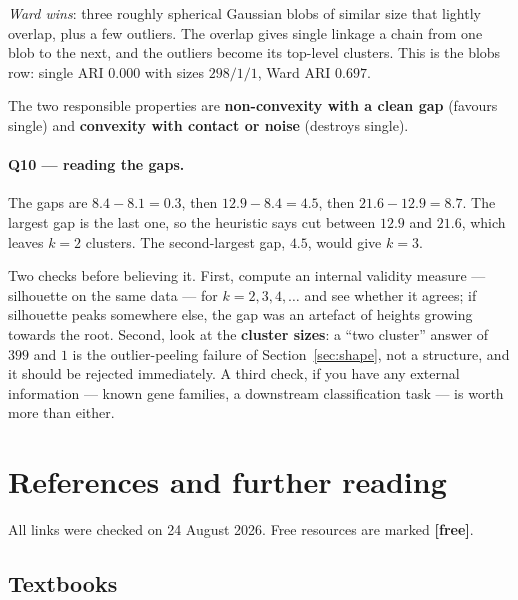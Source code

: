 \documentclass[11pt]{article}
\begin{document}
\emph{Ward wins}: three roughly spherical Gaussian blobs of similar size that
lightly overlap, plus a few outliers. The overlap gives single linkage a chain
from one blob to the next, and the outliers become its top-level clusters.
This is the blobs row: single ARI $0.000$ with sizes $298/1/1$, Ward ARI
$0.697$.

The two responsible properties are \textbf{non-convexity with a clean gap}
(favours single) and \textbf{convexity with contact or noise} (destroys
single).

\paragraph{Q10 --- reading the gaps.}
The gaps are $8.4 - 8.1 = 0.3$, then $12.9 - 8.4 = 4.5$, then
$21.6 - 12.9 = 8.7$. The largest gap is the last one, so the heuristic says
cut between $12.9$ and $21.6$, which leaves \textbf{$k = 2$} clusters. The
second-largest gap, $4.5$, would give $k = 3$.

Two checks before believing it. First, compute an internal validity measure
--- silhouette on the same data --- for $k = 2, 3, 4, \ldots$ and see whether
it agrees; if silhouette peaks somewhere else, the gap was an artefact of
heights growing towards the root. Second, look at the \textbf{cluster sizes}:
a ``two cluster'' answer of $399$ and $1$ is the outlier-peeling failure of
Section~\ref{sec:shape}, not a structure, and it should be rejected
immediately. A third check, if you have any external information --- known
gene families, a downstream classification task --- is worth more than either.

\section{References and further reading}
\label{sec:refs}

All links were checked on 24 August 2026. Free resources are marked
\textbf{[free]}.

\subsection*{Textbooks}
\end{document}

